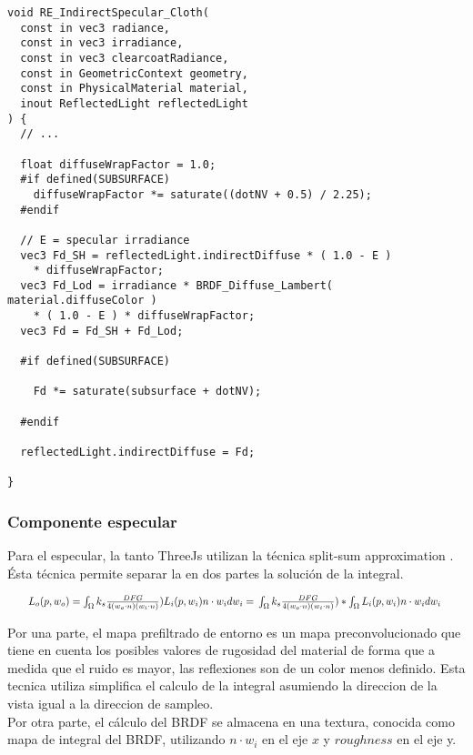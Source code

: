       \begin{lstlisting}
void RE_IndirectSpecular_Cloth(
  const in vec3 radiance,
  const in vec3 irradiance,
  const in vec3 clearcoatRadiance,
  const in GeometricContext geometry,
  const in PhysicalMaterial material,
  inout ReflectedLight reflectedLight
) {
  // ...

  float diffuseWrapFactor = 1.0;
  #if defined(SUBSURFACE)
    diffuseWrapFactor *= saturate((dotNV + 0.5) / 2.25);
  #endif

  // E = specular irradiance
  vec3 Fd_SH = reflectedLight.indirectDiffuse * ( 1.0 - E )
    * diffuseWrapFactor;
  vec3 Fd_Lod = irradiance * BRDF_Diffuse_Lambert( material.diffuseColor )
    * ( 1.0 - E ) * diffuseWrapFactor;
  vec3 Fd = Fd_SH + Fd_Lod;

  #if defined(SUBSURFACE)

    Fd *= saturate(subsurface + dotNV);

  #endif

  reflectedLight.indirectDiffuse = Fd;

}
      \end{lstlisting}

      \singlespacing

    \subsubsection{Componente especular}
    \bgroup
      Para el especular, la tanto ThreeJs utilizan la t\'ecnica split-sum approximation
      \autocite{unreal}. \'Esta t\'ecnica permite separar la en dos partes la soluci\'on de la
      integral.

      \begin{equation}
        \resizebox{0.95\hsize}{!}{%
        $L_o(p, w_o) =
        \int_{\Omega} k_s \frac{DFG}{4(w_o\cdot{n})(w_i\cdot{n})})L_i(p, w_i)n\cdot{w_i}dw_i = \\
        \int_{\Omega} k_s \frac{DFG}{4(w_o\cdot{n})(w_i\cdot{n})}) *
        \int_{\Omega}L_i(p, w_i)n\cdot{w_i}dw_i$   
        }
      \end{equation}
      \singlespacing

      Por una parte, el mapa prefiltrado de entorno es un mapa preconvolucionado que tiene en cuenta
      los posibles valores de rugosidad del material de forma que a medida que el ruido es mayor, las
      reflexiones son de un color menos definido. Esta tecnica utiliza simplifica el calculo de
      la integral asumiendo la direccion de la vista igual a la direccion de sampleo.\\
      Por otra parte, el c\'alculo del BRDF se almacena en una textura, conocida como mapa de integral
      del BRDF, utilizando $n\cdot{w_i}$ en el eje $x$ y $roughness$ en el eje y.

